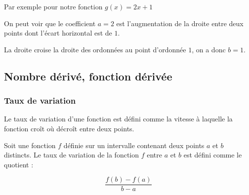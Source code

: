\documentclass[10pt,a4paper]{book}
\begin{document}
Par exemple pour notre fonction $g(x)=2x+1$

\begin{minipage}{0.5\textwidth}
\end{minipage}
\begin{minipage}{0.47\textwidth}
    On peut voir que le coefficient $a=2$ est l'augmentation de la droite entre deux points dont l'écart horizontal est de $1$.

    La droite croise la droite des ordonnées au point d'ordonnée $1$, on a donc $b=1$.

\end{minipage}


\subsection{Nombre dérivé, fonction dérivée}

\subsubsection{Taux de variation}

Le taux de variation d'une fonction est défini comme la vitesse à laquelle la fonction croît où décroît entre deux points. 

\begin{de}
    Soit une fonction $f$ définie sur un intervalle contenant deux points $a$ et $b$ distincts. Le taux de variation de la fonction $f$ entre $a$ et $b$ est défini comme le quotient :

    \[ \frac{f(b)-f(a)}{b-a}\]
\end{de}
\end{document}
